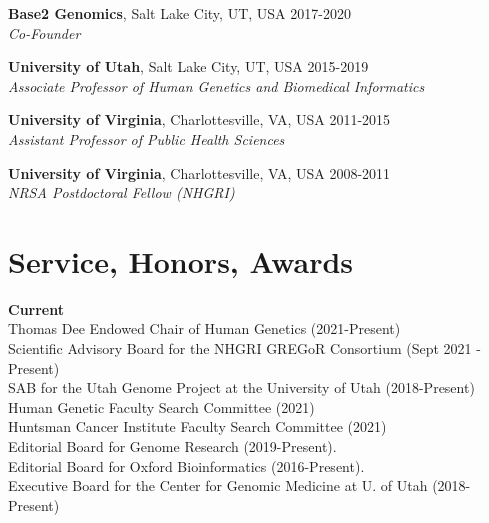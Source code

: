 \documentclass[margin,line]{cv}
\begin{document}
\begin{resume}
    \textbf{Base2 Genomics}, Salt Lake City, UT, USA                                        \hfill 2017-2020\\
    \textit{Co-Founder}                                                                                     

    \textbf{University of Utah}, Salt Lake City, UT, USA                                   \hfill 2015-2019\\
    \textit{Associate Professor of Human Genetics and Biomedical Informatics}                              

    \textbf{University of Virginia}, Charlottesville, VA, USA                              \hfill 2011-2015\\
    \textit{Assistant Professor of Public Health Sciences}                              

    \textbf{University of Virginia}, Charlottesville, VA, USA                              \hfill 2008-2011\\
    \textit{NRSA Postdoctoral Fellow (NHGRI)}                                          

    \section{\mysidestyle Service, Honors, Awards}
    \textbf{Current}\\
    Thomas Dee Endowed Chair of Human Genetics (2021-Present)  \\\vspace{1mm}%
    Scientific Advisory Board for the NHGRI GREGoR Consortium (Sept 2021 - Present) \\\vspace{1mm}%
    SAB for the Utah Genome Project at the University of Utah (2018-Present) \\\vspace{1mm}%
    Human Genetic Faculty Search Committee (2021) \\\vspace{1mm}%
    Huntsman Cancer Institute Faculty Search Committee (2021) \\\vspace{1mm}%
    Editorial Board for Genome Research (2019-Present). \\\vspace{1mm}%
    Editorial Board for Oxford Bioinformatics (2016-Present). \\\vspace{1mm}%
    Executive Board for the Center for Genomic Medicine at U. of Utah (2018-Present) \\\vspace{1mm}%


\end{resume}
\end{document}
